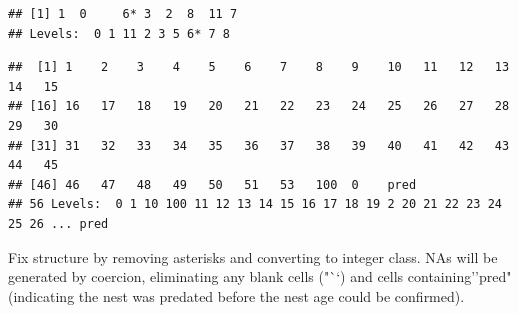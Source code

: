 \documentclass[]{article}
\newenvironment{Shaded}{\begin{snugshade}}{\end{snugshade}}
\newcommand{\CharTok}[1]{\textcolor[rgb]{0.31,0.60,0.02}{#1}}
\newcommand{\CommentTok}[1]{\textcolor[rgb]{0.56,0.35,0.01}{\textit{#1}}}
\newcommand{\DataTypeTok}[1]{\textcolor[rgb]{0.13,0.29,0.53}{#1}}
\newcommand{\KeywordTok}[1]{\textcolor[rgb]{0.13,0.29,0.53}{\textbf{#1}}}
\newcommand{\NormalTok}[1]{#1}
\newcommand{\OperatorTok}[1]{\textcolor[rgb]{0.81,0.36,0.00}{\textbf{#1}}}
\newcommand{\StringTok}[1]{\textcolor[rgb]{0.31,0.60,0.02}{#1}}
\begin{document}
\begin{verbatim}
## [1] 1  0     6* 3  2  8  11 7 
## Levels:  0 1 11 2 3 5 6* 7 8
\end{verbatim}

\begin{Shaded}
\end{Shaded}

\begin{verbatim}
##  [1] 1    2    3    4    5    6    7    8    9    10   11   12   13   14   15  
## [16] 16   17   18   19   20   21   22   23   24   25   26   27   28   29   30  
## [31] 31   32   33   34   35   36   37   38   39   40   41   42   43   44   45  
## [46] 46   47   48   49   50   51   53   100  0    pred     
## 56 Levels:  0 1 10 100 11 12 13 14 15 16 17 18 19 2 20 21 22 23 24 25 26 ... pred
\end{verbatim}

Fix structure by removing asterisks and converting to integer class. NAs
will be generated by coercion, eliminating any blank cells ("``) and
cells containing''pred" (indicating the nest was predated before the
nest age could be confirmed).

\begin{Shaded}
\end{Shaded}
\end{document}
